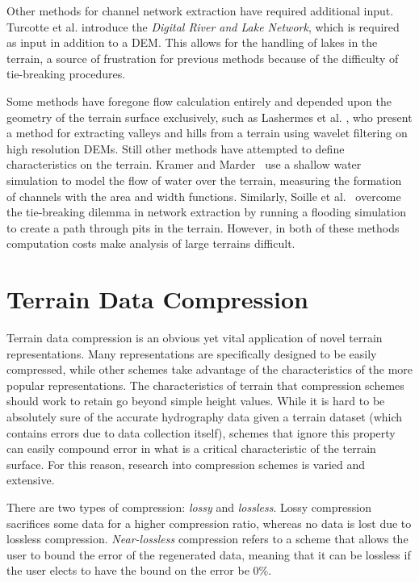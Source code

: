 Other methods for channel network extraction have required additional
input. Turcotte et
al. \cite{Turcotte_Fortin_Rousseau_Massicotte_Villeneuve_2001}
introduce the {\em Digital River and Lake Network}, which is required
as input in addition to a DEM. This allows for the handling of lakes
in the terrain, a source of frustration for previous methods because
of the difficulty of tie-breaking procedures.

Some methods have foregone flow calculation entirely and
depended upon the geometry of the terrain surface exclusively, such as
Lashermes et al. \cite{Bruno2007}, who present a method for
extracting valleys and hills from a terrain using wavelet filtering on
high resolution DEMs.  Still other methods have attempted to define
characteristics on the terrain. Kramer and
Marder~\cite{PhysRevLett.68.205} use a shallow water simulation to
model the flow of water over the terrain, measuring the formation of
channels with the area and width functions. Similarly, Soille et
al.~\cite{Soille_carvingand} overcome the tie-breaking dilemma in
network extraction by running a flooding simulation to create a path
through pits in the terrain. However, in both of these methods computation
costs make analysis of large terrains difficult.


\section{Terrain Data Compression}
\label{section:TerrainDataCompression}

Terrain data compression is an obvious yet vital application of novel terrain representations. Many representations are specifically designed to be easily compressed, while other schemes take advantage of the characteristics of the more popular representations. The characteristics of terrain that compression schemes should work to retain go beyond simple height values. While it is hard to be absolutely sure of the accurate hydrography data given a terrain dataset (which contains errors due to data collection itself), schemes that ignore this property can easily compound error in what is a critical characteristic of the terrain surface. For this reason, research into compression schemes is varied and extensive.

There are two types of compression: \textit{lossy} and \textit{lossless}. Lossy compression sacrifices some data for a higher compression ratio, whereas no data is lost due to lossless compression. \textit{Near-lossless} compression refers to a scheme that allows the user to bound the error of the regenerated data, meaning that it can be lossless if the user elects to have the bound on the error be 0\%.

